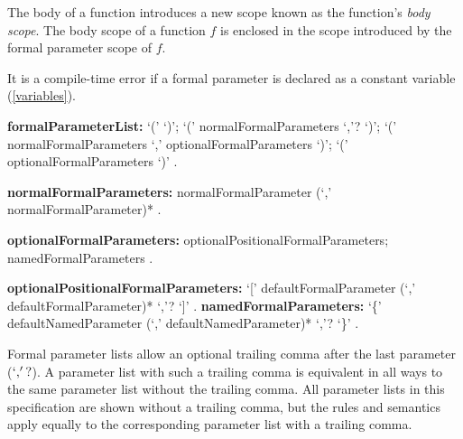 \documentclass{article}
\begin{document}
\LMHash{}
The body of a function introduces a new scope known as the function's {\em  body scope}. The body scope of a function $f$  is enclosed  in the scope introduced by the formal parameter scope of $f$.




\LMHash{}
It is a compile-time error if a formal parameter is declared as a constant variable (\ref{variables}).

\begin{grammar}
{\bf formalParameterList:}
     `(' `)';
     `(' normalFormalParameters `,'? `)';
     `(' normalFormalParameters `,'  optionalFormalParameters `)';
     `(' optionalFormalParameters `)'
   .


{\bf normalFormalParameters:}
      normalFormalParameter (`,' normalFormalParameter)*
    .

{\bf optionalFormalParameters:}
      optionalPositionalFormalParameters;
      namedFormalParameters
    .

{\bf optionalPositionalFormalParameters:}
      `[' defaultFormalParameter (`,' defaultFormalParameter)* `,'? `]'
    .
{\bf namedFormalParameters:}
      `\{' defaultNamedParameter (`,' defaultNamedParameter)* `,'? `\}'
    .
\end{grammar}

Formal parameter lists allow an optional trailing comma after the last parameter ($`,'?$). A parameter list with such a trailing comma is equivalent in all ways to the same parameter list without the trailing comma. All parameter lists in this specification are shown without a trailing comma, but the rules and semantics apply equally to the corresponding parameter list with a trailing comma.

\end{document}
